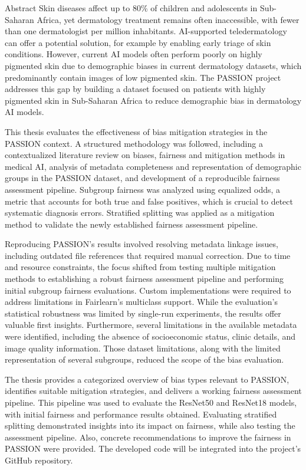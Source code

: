 \documentclass[12pt, a4paper, oneside]{book}   	%
\begin{document}
	
	\begin{abstractstyle}{Abstract}
	   \noindent
	   Skin diseases affect up to 80\% of children and adolescents in Sub-Saharan Africa, yet dermatology treatment remains often inaccessible, with fewer than one dermatologist per million inhabitants. AI-supported teledermatology can offer a potential solution, for example by enabling early triage of skin conditions. However, current AI models often perform poorly on highly pigmented skin due to demographic biases in current dermatology datasets, which predominantly contain images of low pigmented skin. The PASSION project addresses this gap by building a dataset focused on patients with highly pigmented skin in Sub-Saharan Africa to reduce demographic bias in dermatology AI models.
	   
	   This thesis evaluates the effectiveness of bias mitigation strategies in the PASSION context. A structured methodology was followed, including a contextualized literature review on biases, fairness and mitigation methods in medical AI, analysis of metadata completeness and representation of demographic groups in the PASSION dataset, and development of a reproducible fairness assessment pipeline. Subgroup fairness was analyzed using equalized odds, a metric that accounts for both true and false positives, which is crucial to detect systematic diagnosis errors. Stratified splitting was applied as a mitigation method to validate the newly established fairness assessment pipeline.
	   
	   Reproducing PASSION's results involved resolving metadata linkage issues, including outdated file references that required manual correction. Due to time and resource constraints, the focus shifted from testing multiple mitigation methods to establishing a robust fairness assessment pipeline and performing initial subgroup fairness evaluations. Custom implementations were required to address limitations in Fairlearn’s multiclass support. While the evaluation's statistical robustness was limited by single-run experiments, the results offer valuable first insights. Furthermore, several limitations in the available metadata were identified, including the absence of socioeconomic status, clinic details, and image quality information. Those dataset limitations, along with the limited representation of several subgroups, reduced the scope of the bias evaluation.
	   
	   The thesis provides a categorized overview of bias types relevant to PASSION, identifies suitable mitigation strategies, and delivers a working fairness assessment pipeline. This pipeline was used to evaluate the ResNet50 and ResNet18 models, with initial fairness and performance results obtained. Evaluating stratified splitting demonstrated insights into its impact on fairness, while also testing the assessment pipeline. Also, concrete recommendations to improve the fairness in PASSION were provided. The developed code will be integrated into the project's GitHub repository.
	   

\end{abstractstyle}
\end{document}
